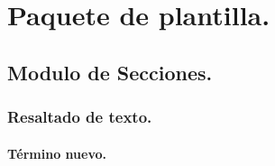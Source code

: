 \part{Paquete de plantilla.}

\chapter{Modulo de Secciones.}

\section{Resaltado de texto.}

    \subsection{Término nuevo.}
    
